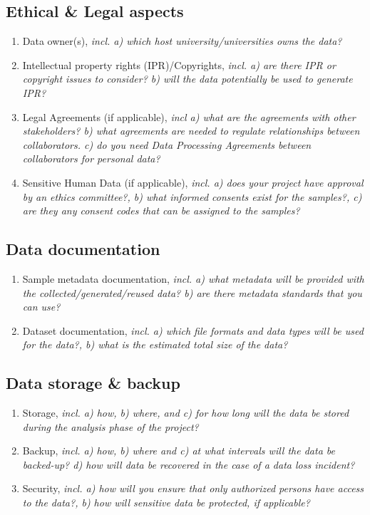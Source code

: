 \documentclass[10pt,a4paper,]{article}
\providecommand{\tightlist}{%
  \setlength{\itemsep}{0pt}\setlength{\parskip}{0pt}}
\begin{document}
\subsection{Ethical \& Legal aspects}\label{ethical-legal-aspects}

\begin{enumerate}
\def\labelenumi{\arabic{enumi}.}
\tightlist
\item
  Data owner(s), \emph{incl. a) which host university/universities owns
  the data?}
\item
  Intellectual property rights (IPR)/Copyrights, \emph{incl. a) are
  there IPR or copyright issues to consider? b) will the data
  potentially be used to generate IPR?}
\item
  Legal Agreements (if applicable), \emph{incl a) what are the
  agreements with other stakeholders? b) what agreements are needed to
  regulate relationships between collaborators. c) do you need Data
  Processing Agreements between collaborators for personal data?}
\item
  Sensitive Human Data (if applicable), \emph{incl. a) does your project
  have approval by an ethics committee?, b) what informed consents exist
  for the samples?, c) are they any consent codes that can be assigned
  to the samples?}
\end{enumerate}

\subsection{Data documentation}\label{data-documentation}

\begin{enumerate}
\def\labelenumi{\arabic{enumi}.}
\tightlist
\item
  Sample metadata documentation, \emph{incl. a) what metadata will be
  provided with the collected/generated/reused data? b) are there
  metadata standards that you can use?}
\item
  Dataset documentation, \emph{incl. a) which file formats and data
  types will be used for the data?, b) what is the estimated total size
  of the data?}
\end{enumerate}

\subsection{Data storage \& backup}\label{data-storage-backup}

\begin{enumerate}
\def\labelenumi{\arabic{enumi}.}
\tightlist
\item
  Storage, \emph{incl. a) how, b) where, and c) for how long will the
  data be stored during the analysis phase of the project?}
\item
  Backup, \emph{incl. a) how, b) where and c) at what intervals will the
  data be backed-up? d) how will data be recovered in the case of a data
  loss incident?}
\item
  Security, \emph{incl. a) how will you ensure that only authorized
  persons have access to the data?, b) how will sensitive data be
  protected, if applicable?}
\end{enumerate}
\end{document}
